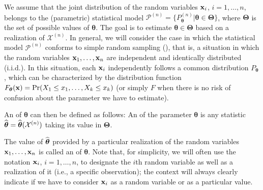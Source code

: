 We assume that the joint distribution of the random variables $\mathbf x_i$, $i=1,
\dots, n$, belongs to the (parametric) statistical model $\mathcal{P}^{(n)} =
\{P_{\boldsymbol\theta}^{(n)} | \boldsymbol\theta \in \boldsymbol\Theta\}$,     
where $\boldsymbol\Theta$ is the set of possible values of $\boldsymbol\theta$. 
The goal is to estimate $\boldsymbol\theta \in \boldsymbol\Theta$ based on a
realization of $\mathcal{X}^{(n)}$. In general, we will consider the case in
which the statistical model $\mathcal{P}^{(n)}$ conforms to simple random
sampling (), that is, a situation in which the random variables
$\mathbf x_1, \dots, \mathbf x_n$ are independent and identically distributed
(i.i.d.). In this situation, each $\mathbf x_i$ independently follows a common
distribution $P_{\boldsymbol\theta}$, which can be characterized by the
distribution function $F_{\boldsymbol\theta}(\mathbf x) = \Pr(X_1 \leq x_1,
\dots, X_k \leq x_k)$ (or simply $F$ when there is no risk of confusion about
the parameter we have to estimate).

An \emph{} of $\boldsymbol\theta$ can then be defined as
follows: An  of the parameter $\boldsymbol\theta$ is any
statistic $\widehat{\boldsymbol\theta} =
\widehat{\boldsymbol\theta}(\mathcal{X}^{(n)})$ taking its value in
$\boldsymbol\Theta$.

The value of $\widehat{\boldsymbol\theta}$ provided by a particular realization
of the random variables $\mathbf x_1, \dots, \mathbf x_n$ is called an
\emph{} of $\boldsymbol\theta$. Note that, for simplicity, we
will often use the notation $\mathbf x_i$, $i = 1, \dots, n$, to designate the
$i$th random variable as well as a realization of it (i.e., a specific
observation); the context will always clearly indicate if we have to consider
$\mathbf x_i$ as a random variable or as a particular value.

